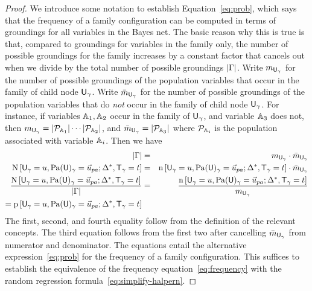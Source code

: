 \documentclass[twoside,11pt]{article}
\begin{document}
\begin{proof}
We introduce some notation to establish Equation~\ref{eq:prob}, which says that the frequency of a family configuration can be computed in terms of groundings for all variables in the Bayes net. The basic reason why this is true is that, compared to  groundings for variables in the family only, the number of possible groundings for the family  increases by a constant factor that cancels out when we divide by the total number of possible groundings $|\Gamma|$. 
Write $m_{\mathsf{U}_\gamma}$ for the number of possible groundings of the population variables that occur in the family of child node $\mathsf{U}_\gamma$.
Write $\bar{m}_{\mathsf{U}_\gamma}$ for the number of possible groundings of the population variables that do {\em not} occur in the family of child node $\mathsf{U}_\gamma$. For instance, if variables $\mathbb{A}_{1},\mathbb{A}_{2}$ occur in the family of $\mathsf{U}_\gamma$, and variable $\mathbb{A}_{3}$ does not, then $m_{\mathsf{U}_\gamma} = |\mathcal{P}_{\mathbb{A}_{1}}| \cdots |\mathcal{P}_{\mathbb{A}_{2}}|$, and $\bar{m}_{\mathsf{U}_\gamma} = |\mathcal{P}_{\mathbb{A}_{3}}|$ where $\mathcal{P}_{\mathbb{A}_{i}}$ is the population associated with variable $\mathbb{A}_{i}$.  Then we have
\begin{eqnarray*}
|\groundall| & = & m_{\Ground{\UI}} \cdot \bar{m}_{\Ground{\UI}}\\
\BigCount{\Appendterm{\Ground{\UI}  = \UV} {\Ground{\Pa{\UI}} = \Prange{\UT}}} {\QC,\Ground{\TI} = \TV} & = & \Count{\Appendterm{\Ground{\UI}  = \UV} {\Ground{\Pa{\UI}} = \Prange{\UT}}} {\QC,\Ground{\TI} = \TV}\cdot \bar{m}_{\Ground{\UI}}\\
\frac{\BigCount{\Appendterm{\Ground{\UI}  = \UV} {\Ground{\Pa{\UI}} = \Prange{\UT}}} {\QC,\Ground{\TI} = \TV}}{|\groundall|} &=&\frac{\Count{\Appendterm{\Ground{\UI}  = \UV} {\Ground{\Pa{\UI}} = \Prange{\UT}}} {\QC,\Ground{\TI} = \TV}}{m_{\Ground{\UI}}}\\
 =  \Freq{\Appendterm{\Ground{\UI}  = \UV} {\Ground{\Pa{\UI}} = \Prange{\UT}}} {\QC,\Ground{\TI} = \TV}
\end{eqnarray*}
The first, second, and fourth equality follow from the definition of the relevant concepts. The third equation follows from the first two after cancelling $ \bar{m}_{\mathsf{U}_\gamma}$ from numerator and denominator. The equations entail the alternative expression~\eqref{eq:prob} for the frequency of a family configuration. This suffices to establish the equivalence of the frequency equation~\eqref{eq:frequency} with the random regression formula~\eqref{eq:simplify-halpern}.
\end{proof}


%


\end{document}
